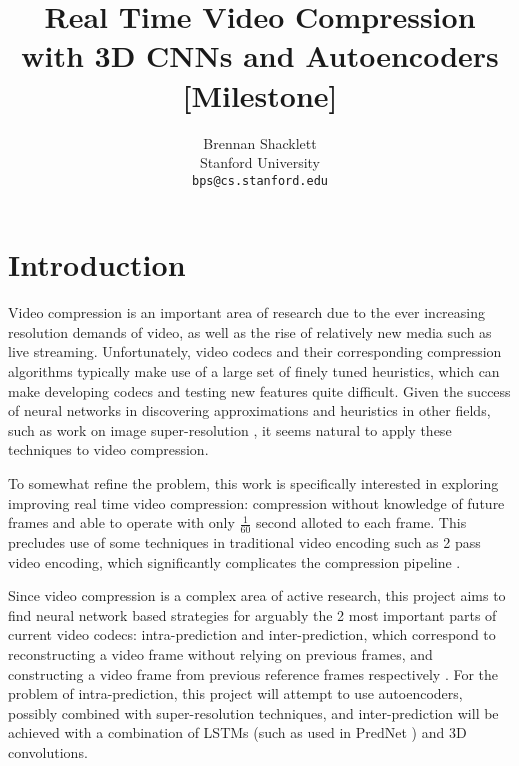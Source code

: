 \documentclass[10pt,twocolumn,letterpaper]{article}
\begin{document}
\title{Real Time Video Compression with 3D CNNs and Autoencoders [Milestone]}

\author{Brennan Shacklett\\
Stanford University\\
{\tt\small bps@cs.stanford.edu}
}

\maketitle

\section{Introduction}

Video compression is an important area of research due to the ever increasing resolution demands of video, as well as the rise of relatively new media such as live streaming. Unfortunately, video codecs and their corresponding compression algorithms typically make use of a large set of finely tuned heuristics, which can make developing codecs and testing new features quite difficult. Given the success of neural networks in discovering approximations and heuristics in other fields, such as work on image super-resolution \cite{DBLP:journals/corr/DongLHT15}, it seems natural to apply these techniques to video compression.

To somewhat refine the problem, this work is specifically interested in exploring improving real time video compression: compression without knowledge of future frames and able to operate with only $\frac{1}{60}$ second alloted to each frame. This precludes use of some techniques in traditional video encoding such as 2 pass video encoding, which significantly complicates the compression pipeline \cite{5389233}.

Since video compression is a complex area of active research, this project aims to find neural network based strategies for arguably the 2 most important parts of current video codecs: intra-prediction and inter-prediction, which correspond to reconstructing a video frame without relying on previous frames, and constructing a video frame from previous reference frames respectively \cite{LeGall}. For the problem of intra-prediction, this project will attempt to use autoencoders, possibly combined with super-resolution techniques, and inter-prediction will be achieved with a combination of LSTMs (such as used in PredNet \cite{prednet}) and 3D convolutions.
\end{document}
